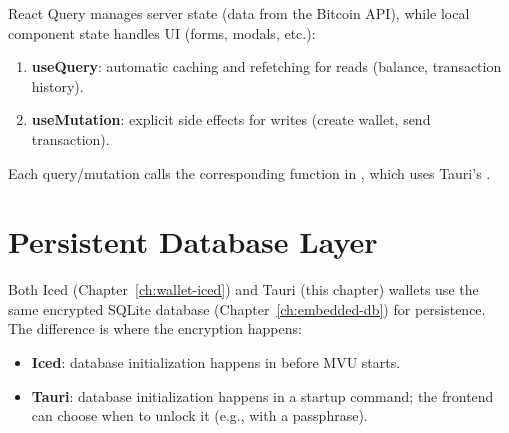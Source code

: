 React Query manages server state (data from the Bitcoin API), while local component state handles UI (forms, modals, etc.):

\begin{enumerate}
  \item \textbf{useQuery}: automatic caching and refetching for reads (balance, transaction history).
  \item \textbf{useMutation}: explicit side effects for writes (create wallet, send transaction).
\end{enumerate}

Each query/mutation calls the corresponding function in , which uses Tauri's .

\section{Persistent Database Layer}
\label{sec:ch19-database}

Both Iced (Chapter~\ref{ch:wallet-iced}) and Tauri (this chapter) wallets use the same encrypted SQLite database (Chapter~\ref{ch:embedded-db}) for persistence. The difference is where the encryption happens:

\begin{itemize}
  \item \textbf{Iced}: database initialization happens in  before MVU starts.
  \item \textbf{Tauri}: database initialization happens in a startup command; the frontend can choose when to unlock it (e.g., with a passphrase).
\end{itemize}

